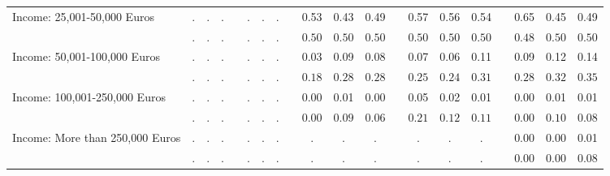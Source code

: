 \begin{center}
{\begin{longtable}{L{5cm} c c c p{.5cm} c c c p{.5cm} c c c p{.5cm} c c c p{.5cm} c c c}
 \quad Income: 25,001-50,000 Euros & . &         . &         . & &         . &         . &         . & &      0.53 &      0.43 &      0.49 & &      0.57 &      0.56 &      0.54 & &      0.65 &      0.45 &      0.49 \\*
 \quad & $\mathit{        .}$ & $\mathit{        .}$ & $\mathit{        .}$ & & $\mathit{        .}$ & $\mathit{        .}$ & $\mathit{        .}$ & & $\mathit{     0.50}$ & $\mathit{     0.50}$ & $\mathit{     0.50}$ & & $\mathit{     0.50}$ & $\mathit{     0.50}$ & $\mathit{     0.50}$ & & $\mathit{     0.48}$ & $\mathit{     0.50}$ & $\mathit{     0.50}$ \\[.2em]
 \quad Income: 50,001-100,000 Euros & . &         . &         . & &         . &         . &         . & &      0.03 &      0.09 &      0.08 & &      0.07 &      0.06 &      0.11 & &      0.09 &      0.12 &      0.14 \\*
 \quad & $\mathit{        .}$ & $\mathit{        .}$ & $\mathit{        .}$ & & $\mathit{        .}$ & $\mathit{        .}$ & $\mathit{        .}$ & & $\mathit{     0.18}$ & $\mathit{     0.28}$ & $\mathit{     0.28}$ & & $\mathit{     0.25}$ & $\mathit{     0.24}$ & $\mathit{     0.31}$ & & $\mathit{     0.28}$ & $\mathit{     0.32}$ & $\mathit{     0.35}$ \\[.2em]
 \quad Income: 100,001-250,000 Euros & . &         . &         . & &         . &         . &         . & &      0.00 &      0.01 &      0.00 & &      0.05 &      0.02 &      0.01 & &      0.00 &      0.01 &      0.01 \\*
 \quad & $\mathit{        .}$ & $\mathit{        .}$ & $\mathit{        .}$ & & $\mathit{        .}$ & $\mathit{        .}$ & $\mathit{        .}$ & & $\mathit{     0.00}$ & $\mathit{     0.09}$ & $\mathit{     0.06}$ & & $\mathit{     0.21}$ & $\mathit{     0.12}$ & $\mathit{     0.11}$ & & $\mathit{     0.00}$ & $\mathit{     0.10}$ & $\mathit{     0.08}$ \\[.2em]
 \quad Income: More than 250,000 Euros & . &         . &         . & &         . &         . &         . & &         . &         . &         . & &         . &         . &         . & &      0.00 &      0.00 &      0.01 \\*
 \quad & $\mathit{        .}$ & $\mathit{        .}$ & $\mathit{        .}$ & & $\mathit{        .}$ & $\mathit{        .}$ & $\mathit{        .}$ & & $\mathit{        .}$ & $\mathit{        .}$ & $\mathit{        .}$ & & $\mathit{        .}$ & $\mathit{        .}$ & $\mathit{        .}$ & & $\mathit{     0.00}$ & $\mathit{     0.00}$ & $\mathit{     0.08}$ \\[.2em]

\end{longtable}}
\end{center}
